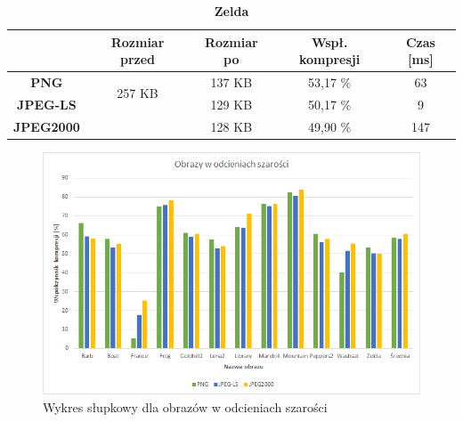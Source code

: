 \begin{table}[!h]
	\centering
	\caption{\textbf{Zelda}}
	\label{my-label}
	\begin{tabular}{|c|c|c|c|c|}                                             
		\hline
		& \textbf{Rozmiar przed} & \textbf{Rozmiar po} & \textbf{Wspł. kompresji} & \textbf{Czas {[}ms{]}} \\ \hline 
		\textbf{PNG}      &          \multicolumn{1}{c|}{\multirow{2}{*}{257 KB}}             &      137 KB               &     53,17 \%                    &          63                   \\\cline{3-5}
		\textbf{JPEG-LS}  &                        &      129 KB               &       50,17 \%                  &         9                 \\\cline{3-5}
		\textbf{JPEG2000} &                        &      128 KB               &       49,90 \%                  &        147              \\ \hline
	\end{tabular}
\end{table}


\begin{figure}[!h]
	\centering
	\includegraphics[width=1.1\textwidth]{./greyset.png}
	\caption{Wykres słupkowy dla obrazów w odcieniach szarości}
	\label{img:greyset}
\end{figure}

\clearpage